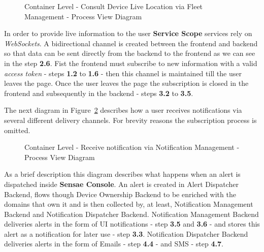 \begin{figure}[H]
   \centering
   \resizebox{\columnwidth}{!}
   {
      
   }
   \caption[Container Level - Consult Device Live Location via Fleet Management - Process View Diagram]{Container Level - Consult Device Live Location via Fleet Management - Process View Diagram}
   \label{fig:design:architecture:container:process:diagram:fleet}
\end{figure}

In order to provide live information to the user \textbf{Service Scope} services rely on \textit{WebSockets}. A bidirectional channel is created between the frontend and backend so that data can be sent directly from the backend to the frontend as we can see in the step \textbf{2.6}. Fist the frontend must subscribe to new information with a valid \textit{access token} - steps \textbf{1.2} to \textbf{1.6} - then this channel is maintained till the user leaves the page. Once the user leaves the page the subscription is closed in the frontend and subsequently in the backend - steps \textbf{3.2} to \textbf{3.5}.

The next diagram in Figure~\ref{fig:design:architecture:container:process:diagram:notification} describes how a user receives notifications via several different delivery channels. For brevity reasons the subscription process is omitted.

\begin{figure}[H]
   \centering
   \resizebox{\columnwidth}{!}
   {
      
   }
   \caption[Container Level - Receive notification via Notification Management - Process View Diagram]{Container Level - Receive notification via Notification Management - Process View Diagram}
   \label{fig:design:architecture:container:process:diagram:notification}
\end{figure}

As a brief description this diagram describes what happens when an alert is dispatched inside \textbf{Sensae Console}. An alert is created in Alert Dispatcher Backend, flows though Device Ownership Backend to be enriched with the domains that own it and is then collected by, at least, Notification Management Backend and Notification Dispatcher Backend. Notification Management Backend deliveries alerts in the form of \gls{UI} notifications - step \textbf{3.5} and \textbf{3.6} - and stores this alert as a notification for later use - step \textbf{3.3}. Notification Dispatcher Backend deliveries alerts in the form of Emails - step \textbf{4.4} - and SMS - step \textbf{4.7}.


